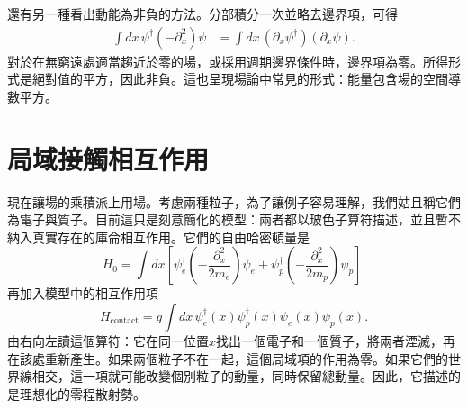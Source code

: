 \begin{classroomqa}
\end{classroomqa}

\begin{classroomqa}
\end{classroomqa}

\begin{classroomqa}
\end{classroomqa}

還有另一種看出動能為非負的方法。分部積分一次並略去邊界項，可得
\begin{align}
\int dx\,\psi^\dagger(-\partial_x^2)\psi
&=\int dx\,(\partial_x\psi^\dagger)(\partial_x\psi).
\label{eq:l9-positive-kinetic}
\end{align}
對於在無窮遠處適當趨近於零的場，或採用週期邊界條件時，邊界項為零。所得形式是絕對值的平方，因此非負。這也呈現場論中常見的形式：能量包含場的空間導數平方。

\section{局域接觸相互作用}

現在讓場的乘積派上用場。考慮兩種粒子，為了讓例子容易理解，我們姑且稱它們為電子與質子。目前這只是刻意簡化的模型：兩者都以玻色子算符描述，並且暫不納入真實存在的庫侖相互作用。它們的自由哈密頓量是
\begin{equation}
H_0=\int dx\left[
\psi_e^\dagger\left(-\frac{\partial_x^2}{2m_e}\right)\psi_e
+
\psi_p^\dagger\left(-\frac{\partial_x^2}{2m_p}\right)\psi_p
\right].
\end{equation}
再加入模型中的相互作用項
\begin{equation}
H_{\mathrm{contact}}
=g\int dx\,
\psi_e^\dagger(x)\psi_p^\dagger(x)
\psi_e(x)\psi_p(x).
\label{eq:l9-contact}
\end{equation}
由右向左讀這個算符：它在同一位置\(x\)找出一個電子和一個質子，將兩者湮滅，再在該處重新產生。如果兩個粒子不在一起，這個局域項的作用為零。如果它們的世界線相交，這一項就可能改變個別粒子的動量，同時保留總動量。因此，它描述的是理想化的零程散射勢。

